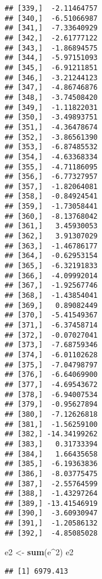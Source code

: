 \documentclass[]{article}
\newenvironment{Shaded}{\begin{snugshade}}{\end{snugshade}}
\newcommand{\KeywordTok}[1]{\textcolor[rgb]{0.13,0.29,0.53}{\textbf{{#1}}}}
\newcommand{\DecValTok}[1]{\textcolor[rgb]{0.00,0.00,0.81}{{#1}}}
\newcommand{\StringTok}[1]{\textcolor[rgb]{0.31,0.60,0.02}{{#1}}}
\newcommand{\NormalTok}[1]{{#1}}
\begin{document}
\begin{verbatim}
## [339,]  -2.11464757
## [340,]  -6.51066987
## [341,]  -7.33640929
## [342,]  -2.61777122
## [343,]  -1.86894575
## [344,]  -5.97151093
## [345,]  -6.91211851
## [346,]  -3.21244123
## [347,]  -4.86746876
## [348,]  -3.74508420
## [349,]  -1.11822031
## [350,]  -3.49893751
## [351,]  -4.36478674
## [352,]  -3.86561390
## [353,]  -6.87485532
## [354,]  -4.63368334
## [355,]  -4.71186095
## [356,]  -6.77327957
## [357,]  -1.82064081
## [358,]  -0.84924541
## [359,]  -1.73058441
## [360,]  -8.13768042
## [361,]   3.45930053
## [362,]   3.91307029
## [363,]  -1.46786177
## [364,]  -0.62953154
## [365,]  -6.32191833
## [366,]  -4.09992014
## [367,]  -1.92567746
## [368,]  -1.43854041
## [369,]   0.89082449
## [370,]  -5.41549367
## [371,]  -6.37458714
## [372,]  -0.07027041
## [373,]  -7.68759346
## [374,]  -6.01102628
## [375,]  -7.04798797
## [376,]  -6.64069900
## [377,]  -4.69543672
## [378,]  -6.94007534
## [379,]  -0.95627894
## [380,]  -7.12626818
## [381,]  -1.56259100
## [382,] -14.34199262
## [383,]   0.31733394
## [384,]   1.66435658
## [385,]  -6.19363836
## [386,]  -8.03775475
## [387,]  -2.55764599
## [388,]  -1.43297264
## [389,] -13.41546919
## [390,]  -3.60930947
## [391,]  -1.20586132
## [392,]  -4.85085028
\end{verbatim}

\begin{Shaded}
\begin{Highlighting}[]
\NormalTok{e2 <-}\StringTok{ }\KeywordTok{sum}\NormalTok{(e^}\DecValTok{2}\NormalTok{)}
\NormalTok{e2}
\end{Highlighting}
\end{Shaded}

\begin{verbatim}
## [1] 6979.413
\end{verbatim}
\end{document}
